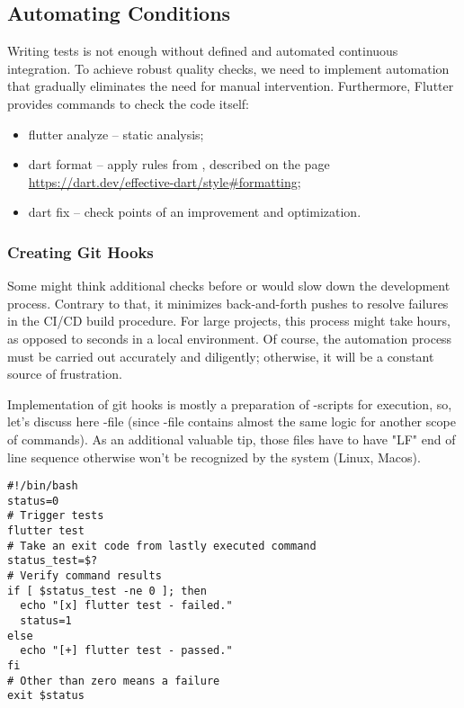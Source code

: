 
\newpage
\subsection{Automating Conditions}

Writing tests is not enough without defined and automated continuous integration. To achieve robust quality checks, we 
need to implement automation that gradually eliminates the need for manual intervention. Furthermore, Flutter provides 
commands to check the code itself:

\begin{itemize}
  \item flutter analyze -- static analysis;
  \item dart format -- apply rules from , described on the page
  \href{https://dart.dev/effective-dart/style\#formatting}{https://dart.dev/effective-dart/style\#formatting};
  \item dart fix -- check points of an improvement and optimization.
\end{itemize}


\subsubsection{Creating Git Hooks}

Some might think additional checks before  or  would slow down the development process. 
Contrary to that, it minimizes back-and-forth pushes to resolve failures in the CI/CD build procedure. For large 
projects, this process might take hours, as opposed to seconds in a local environment. Of course, the automation process 
must be carried out accurately and diligently; otherwise, it will be a constant source of frustration.

Implementation of git hooks is mostly a preparation of -scripts for execution, so, let's discuss here
-file (since -file contains almost the same logic for another scope of commands). As an
additional valuable tip, those files have to have "LF" end of line sequence otherwise won't be recognized by the system
(Linux, Macos).

\begin{lstlisting}[language=terminal]
#!/bin/bash
status=0
# Trigger tests
flutter test
# Take an exit code from lastly executed command
status_test=$?
# Verify command results
if [ $status_test -ne 0 ]; then
  echo "[x] flutter test - failed."
  status=1
else
  echo "[+] flutter test - passed."
fi
# Other than zero means a failure
exit $status
\end{lstlisting}

